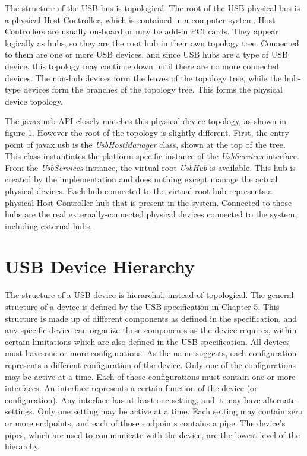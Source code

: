 \documentclass{article}
\newcommand{\myclass}[1]{\emph{#1}}
\newcommand{\myinterface}[1]{\emph{#1}}
\newcommand{\mysectionend}[0]{\vfill\pagebreak[1]}
\begin{document}
The structure of the USB bus is topological.  The root
of the USB physical bus is a physical Host Controller, which is contained
in a computer system.  Host Controllers are usually on-board or may be
add-in PCI cards.  They appear logically as hubs, so they are the root hub
in their own topology tree.  Connected to them are one or more USB devices,
and since USB hubs are a type of USB device, this topology may continue
down until there are no more connected devices.  The non-hub devices form
the leaves of the topology tree, while the hub-type devices form the branches
of the topology tree.  This forms the physical device topology.

The javax.usb API closely matches this physical device topology, as shown in
figure \ref{bus_topology}.  However the root of the topology is slightly different.
First, the entry point of javax.usb is the \myclass{UsbHostManager} class, shown at the
top of the tree.  This class instantiates the platform-specific instance of
the \myinterface{UsbServices} interface.  From the \myinterface{UsbServices} instance, the virtual root
\myinterface{UsbHub} is available.  This hub is created by the implementation and does
nothing except manage the actual physical devices.  Each hub connected to
the virtual root hub represents a physical Host Controller hub that is
present in the system.  Connected to those hubs are the real externally-connected
physical devices connected to the system, including external hubs.

\begin{figure}
\label{bus_topology}
\end{figure}

\mysectionend


\section{USB Device Hierarchy}

The structure of a USB device is hierarchal, instead of topological.  The general
structure of a device is defined by the USB specification in Chapter 5.
This structure is made up of different components as defined in the specification,
and any specific device can organize those components as the device requires,
within certain limitations which are also defined in the USB specification.
All devices must have one or more configurations.  As the name suggests,
each configuration represents a different configuration of the device.
Only one of the configurations may be active at a time.  Each of those configurations
must contain one or more interfaces.  An interface represents a certain function
of the device (or configuration).  Any interface has at least one setting,
and it may have alternate settings.  Only one setting may be active at a time.
Each setting may contain zero or more endpoints, and each of those endpoints
contains a pipe.  The device's pipes, which are used to communicate with the
device, are the lowest level of the hierarchy.
\end{document}
